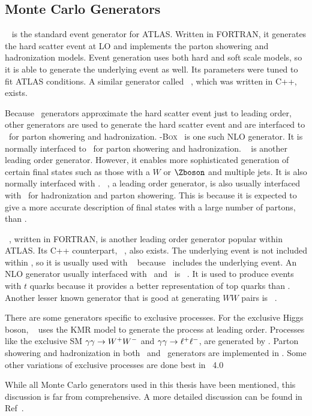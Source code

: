 \subsection{Monte Carlo Generators}
\par \PYTHIAsix~\cite{Pythia6} is the standard event generator for ATLAS.
Written in FORTRAN, it generates the hard scatter event at LO and implements the parton showering 
and hadronization models. Event generation uses both hard and soft scale models, so it is able to 
generate the underlying event as well. Its parameters were tuned to fit ATLAS conditions. 
A similar generator called ~\cite{Pythia8}, which was written in C++, exists. 

\par Because \PYTHIA\ 
generators approximate the hard scatter event just to leading order, other generators are used to 
generate the hard scatter event and are interfaced to \PYTHIA\ for parton showering and hadronization.
\POWHEG-\textsc{Box}~\cite{PowhegBox, Alioli:2008tz,Powheg0,Powheg1,Powheg2} is one such NLO generator. 
It is normally interfaced to \PYTHIA8\ for parton showering and hadronization. \ALPGEN~\cite{Alpgen} is 
another leading order generator. However, it enables more sophisticated generation of certain final states 
such as those with a $W$ or $\Zboson$ and multiple jets. It is also normally interfaced with . 
\SHERPA~\cite{Sherpa}, a leading order generator, is also usually interfaced with \ for hadronization 
and parton showering. This is because it is expected to give a more accurate description of final states with a large number of partons, 
than \PYTHIA8. 

\par  \HERWIG~\cite{Herwig6.5}, written in FORTRAN, is another leading order generator popular within ATLAS. 
Its C++ counterpart, \HERWIGPP~\cite{Hpp}, also exists. The underlying event is not included within \HERWIG, so it is usually 
used with \JIMMY~\cite{Jimmy} because \JIMMY\ includes the underlying event. An NLO generator usually interfaced 
with \HERWIG\ and \JIMMY\ is \MCatNLO~\cite{MCatNLO}. It is used to produce events with $t$ quarks because it 
provides a better representation of top quarks than \PYTHIA8. Another lesser known generator that is good at generating 
$WW$ pairs is \ggww~\cite{gg2WW}.  

\par There are some generators specific to exclusive processes. For the exclusive Higgs boson, \FPMC~\cite{fpmc} uses 
the KMR model to generate the process at leading order. Processes like the exclusive SM $\gamma\gamma \to W^+W^-$ and $\gamma\gamma \to \ell^+\ell^-$, are generated 
by \HERWIGPP. Parton showering and hadronization in both \FPMC\ and \HERWIGPP\ generators are implemented in \JIMMY. Some other 
variations of exclusive processes are done best in \LPAIR~4.0~\cite{Vermaseren}

\par While all Monte Carlo generators used in this thesis have been mentioned, this discussion 
 is far from comprehensive. A more detailed discussion can be found in Ref~\cite{Seymour:2013ega}. 

